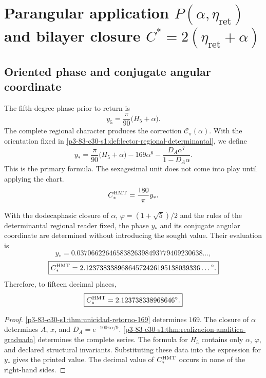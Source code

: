 \section{Parangular application \texorpdfstring{\(P(\alpha,\eta_{\mathrm{ret}})\)}{P(alpha,eta_ret)} and bilayer closure \texorpdfstring{\(C^*=2(\eta_{\mathrm{ret}}+\alpha)\)}{C*=2(eta_ret+alpha)}}
\label{sec:s102:c38:4}

\subsection{Oriented phase and conjugate angular coordinate}
\label{sec:s102:c38:4:1}


The fifth-degree phase prior to return is
\[
y_5=\frac\pi{90}\bigl(H_5+\alpha\bigr).
\]
The complete regional character produces the correction
\(\mathscr C_\pi(\alpha)\). With the orientation fixed in
\cref{p3-83-c30-s1:def:lector-regional-determinantal}, we define
\[
\boxed{
y_*=\frac\pi{90}\bigl(H_5+\alpha\bigr)
-169\alpha^6
-\frac{D_A\alpha^7}{1-D_A\alpha}.}
\]
This is the primary formula. The sexagesimal unit does not come into play until applying the chart.
\[
C_*^{\rm HMT}=\frac{180}{\pi}y_*.
\]

\begin{theorem}
\label{p3-83-c30-s1:thm:contraangulo-regional}
With the dodecaphasic closure of \(\alpha\),
\(\varphi=(1+\sqrt5)/2\) and the rules of the determinantal regional reader fixed, the
phase \(y_*\) and its conjugate angular coordinate are determined without introducing the sought
value. Their evaluation is
\[
\boxed{
y_*=0.03706622646583826398493779409230638\ldots,}
\]
\[
\boxed{
C_*^{\rm HMT}
=2.12373833896864572426195138039336\ldots{}^\circ.}
\]
Therefore, to fifteen decimal places,
\[
\boxed{C_*^{\rm HMT}=2.123738338968646^\circ.}
\]
\end{theorem}

\begin{proof}
\cref{p3-83-c30-s1:thm:unicidad-retorno-169} determines \(169\). The closure of
\(\alpha\) determines \(A\), \(x\), and
\(D_A=e^{-100\pi\alpha/9}\). \cref{p3-83-c30-s1:thm:realizacion-analitica-graduada}
determines the complete series. The formula for \(H_5\) contains only
\(\alpha\), \(\varphi\), and declared structural invariants. Substituting
these data into the expression for \(y_*\) gives the printed value. The decimal value
of \(C_*^{\rm HMT}\) occurs in none of the right-hand sides.
\end{proof}

